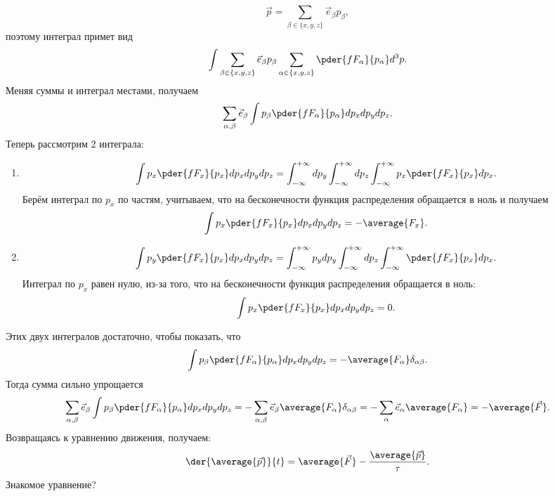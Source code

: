 \[
    \vec{p} = \sum_{\beta\in\{x,y,z\}}\vec{e}_\beta p_\beta,
\]
поэтому интеграл примет вид
\[
    \int\sum_{\beta\in\{x,y,z\}}\vec{e}_\beta p_\beta
    \sum_{\alpha\in\{x,y,z\}}\pder{fF_\alpha}{p_\alpha}d^3p.
\]
Меняя суммы и интеграл местами, получаем
\[
    \sum_{\alpha,\beta}\vec{e}_\beta \int p_\beta \pder{fF_\alpha}{p_\alpha}
    dp_xdp_ydp_z.
\]
Теперь рассмотрим 2 интеграла:
\begin{enumerate}
    \item
            \[
                \int p_x \pder{fF_x}{p_x} dp_xdp_ydp_z =
                \int_{-\infty}^{+\infty} dp_y
                \int_{-\infty}^{+\infty} dp_z
                \int_{-\infty}^{+\infty} p_x \pder{fF_x}{p_x} dp_x.
            \]
            Берём интеграл по \( p_x \) по частям, учитываем, что на
            бесконечности функция распределения обращается в ноль и получаем
            \[
                \int p_x \pder{fF_x}{p_x} dp_xdp_ydp_z = -\average{F_x}.
            \]
    \item
            \[
                \int p_y \pder{fF_x}{p_x} dp_xdp_ydp_z =
                \int_{-\infty}^{+\infty} p_y dp_y
                \int_{-\infty}^{+\infty} dp_z
                \int_{-\infty}^{+\infty} \pder{fF_x}{p_x} dp_x.
            \]
            Интеграл по \( p_x \) равен нулю, из-за того, что на
            бесконечности функция распределения обращается в ноль:
            \[
                \int p_x \pder{fF_x}{p_x} dp_xdp_ydp_z = 0.
            \]
\end{enumerate}
Этих двух интегралов достаточно, чтобы показать, что
\[
    \int p_\beta \pder{fF_\alpha}{p_\alpha} dp_xdp_ydp_z =
    -\average{F_\alpha} \delta_{\alpha\beta}.
\]
Тогда сумма сильно упрощается
\[
    \sum_{\alpha,\beta}\vec{e}_\beta \int p_\beta \pder{fF_\alpha}{p_\alpha}
    dp_xdp_ydp_z =
    - \sum_{\alpha,\beta}\vec{e}_\beta \average{F_\alpha} \delta_{\alpha\beta} =
    - \sum_{\alpha}\vec{e}_\alpha \average{F_\alpha} = -\average{\vec{F}}.
\]
Возвращаясь к уравнению движения, получаем:
\[
    \der{\average{\vec{p}}}{t} = \average{\vec{F}}
    -\frac{\average{\vec{p}}}{\tau}.
\]
Знакомое уравнение?
